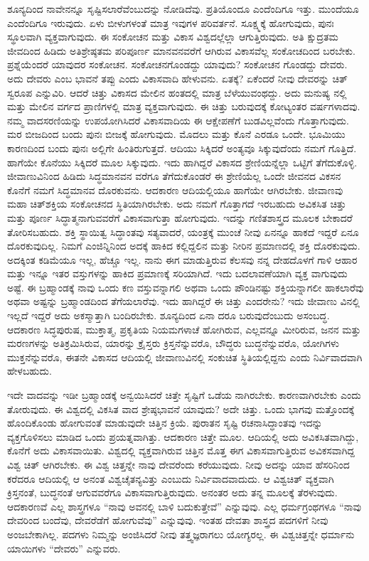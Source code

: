 ಶೂನ್ಯದಿಂದ ನಾವೇನನ್ನೂ ಸೃಷ್ಟಿಸಲಾರೆವೆಂಬುದನ್ನು ನೋಡಿದೆವು. ಪ್ರತಿಯೊಂದೂ ಎಂದೆಂದಿಗೂ ಇತ್ತು. ಮುಂದೆಯೂ ಎಂದೆಂದಿಗೂ ಇರುವುದು. ಏಳು ಬೀಳುಗಳಂತೆ ಮಾತ್ರ ಇವುಗಳ ಪರಿವರ್ತನೆ. ಸೂಕ್ಷ್ಮಕ್ಕೆ ಹೋಗುವುದು, ಪುನಃ ಸ್ಥೂಲವಾಗಿ ವ್ಯಕ್ತವಾಗುವುದು. ಈ ಸಂಕೋಚನ ಮತ್ತು ವಿಕಾಸ ವಿಶ್ವದಲ್ಲೆಲ್ಲಾ ಆಗುತ್ತಿರುವುದು. ಅತಿ ಕ್ಷುದ್ರತಮ ಜೀವದಿಂದ ಹಿಡಿದು ಅತಿಶ್ರೇಷ್ಠತಮ ಪರಿಪೂರ್ಣ ಮಾನವನವರೆಗೆ ಆಗಿರುವ ವಿಕಾಸವೆಲ್ಲ ಸಂಕೋಚದಿಂದ ಬರಬೇಕು. ಪ್ರಶ್ನೆಯೆಂದರೆ ಯಾವುದರ ಸಂಕೋಚನ. ಸಂಕೋಚನಗೊಂಡದ್ದು ಯಾವುದು? ಸಂಕೋಚನ ಗೊಂಡದ್ದು ದೇವರು. ಅದು ದೇವರು ಎಂಬ ಭಾವನೆ ತಪ್ಪು ಎಂದು ವಿಕಾಸವಾದಿ ಹೇಳುವನು. ಏತಕ್ಕೆ? ಏಕೆಂದರೆ ನೀವು ದೇವರನ್ನು ಚಿತ್​ಸ್ವರೂಪ ಎನ್ನುವಿರಿ. ಆದರೆ ಚಿತ್ತು ವಿಕಾಸದ ಮೇಲಿನ ಹಂತದಲ್ಲಿ ಮಾತ್ರ ಬೆಳೆಯುವಂಥದ್ದು. ಅದು ಮನುಷ್ಯ ನಲ್ಲಿ ಮತ್ತು ಮೇಲಿನ ವರ್ಗದ ಪ್ರಾಣಿಗಳಲ್ಲಿ ಮಾತ್ರ ವ್ಯಕ್ತವಾಗುವುದು. ಈ ಚಿತ್ತು ಬರುವುದಕ್ಕೆ ಕೋಟ್ಯಂತರ ವರ್ಷಗಳಾದವು. ನಮ್ಮ ವಾದಸರಣಿಯನ್ನು ಉಪಯೋಗಿಸಿದರೆ ವಿಕಾಸವಾದಿಯ ಈ ಆಕ್ಷೇಪಣೆಗೆ ಬುಡವಿಲ್ಲವೆಂದು ಗೊತ್ತಾಗುವುದು. ಮರ ಬೀಜದಿಂದ ಬಂದು ಪುನಃ ಬೀಜಕ್ಕೆ ಹೋಗುವುದು. ಮೊದಲು ಮತ್ತು ಕೊನೆ ಎರಡೂ ಒಂದೇ. ಭೂಮಿಯು ಕಾರಣದಿಂದ ಬಂದು ಪುನಃ ಅಲ್ಲಿಗೇ ಹಿಂತಿರುಗುತ್ತದೆ. ಆದಿಯು ಸಿಕ್ಕಿದರೆ ಅಂತ್ಯವೂ ಸಿಕ್ಕುವುದೆಂದು ನಮಗೆ ಗೊತ್ತಿದೆ. ಹಾಗೆಯೇ ಕೊನೆಯು ಸಿಕ್ಕಿದರೆ ಮೂಲ ಸಿಕ್ಕುವುದು. ಇದು ಹಾಗಿದ್ದರೆ ವಿಕಾಸದ ಶ್ರೇಣಿಯನ್ನೆಲ್ಲಾ ಒಟ್ಟಿಗೆ ತೆಗೆದುಕೊಳ್ಳಿ. ಜೀವಾಣುವಿನಿಂದ ಹಿಡಿದು ಸಿದ್ಧಮಾನವನ ವರೆಗೂ ತೆಗೆದುಕೊಂಡರೆ ಈ ಶ್ರೇಣಿಯೆಲ್ಲ ಒಂದೇ ಜೀವನದ ವಿಕಸನ ಕೊನೆಗೆ ನಮಗೆ ಸಿದ್ಧಮಾನವ ದೊರಕುವನು. ಆದಕಾರಣ ಆದಿಯಲ್ಲಿಯೂ ಹಾಗೆಯೇ ಆಗಿರಬೇಕು. ಜೀವಾಣವು ಮಹಾ ಚಿತ್​ಶಕ್ತಿಯ ಸಂಕೋಚನದ ಸ್ಥಿತಿಯಾಗಿರಬೇಕು. ಅದು ನಮಗೆ ಗೊತ್ತಾಗದೆ ಇರಬಹುದು ಅವಿಕಸಿತ ಚಿತ್ತು ಮತ್ತು ಪೂರ್ಣ ಸಿದ್ಧಾತ್ಮನಾಗುವವರೆಗೆ ವಿಕಾಸವಾಗುತ್ತಾ ಹೋಗುವುದು. ಇದನ್ನು ಗಣಿತಶಾಸ್ತ್ರದ ಮೂಲಕ ಬೇಕಾದರೆ ತೋರಿಸಬಹುದು. ಶಕ್ತಿ ಸ್ಥಾಯಿತ್ವ ಸಿದ್ಧಾಂತವು ಸತ್ಯವಾದರೆ, ಯಂತ್ರಕ್ಕೆ ಮುಂಚೆ ನೀವು ಏನನ್ನೂ ಹಾಕದೆ ಇದ್ದರೆ ಏನೂ ದೊರಕುವುದಿಲ್ಲ. ನಿಮಗೆ ಎಂಜಿನ್ನಿನಿಂದ ಅದಕ್ಕೆ ಹಾಕಿದ ಕಲ್ಲಿದ್ದಲಿನ ಮತ್ತು ನೀರಿನ ಪ್ರಮಾಣದಲ್ಲಿ ಶಕ್ತಿ ದೊರಕುವುದು. ಅದಕ್ಕಿಂತ ಕಡಿಮೆಯೂ ಇಲ್ಲ, ಹೆಚ್ಚೂ ಇಲ್ಲ. ನಾನು ಈಗ ಮಾಡುತ್ತಿರುವ ಕೆಲಸವು ನನ್ನ ದೇಹದೊಳಗೆ ಗಾಳಿ ಆಹಾರ ಮತ್ತು ಇನ್ನೂ ಇತರ ವಸ್ತುಗಳನ್ನು ಹಾಕಿದ ಪ್ರಮಾಣಕ್ಕೆ ಸರಿಯಾಗಿದೆ. ಇದು ಬದಲಾವಣೆಯಾಗಿ ವ್ಯಕ್ತ ವಾಗುವುದು ಅಷ್ಟೆ. ಈ ಬ್ರಹ್ಮಾಂಡಕ್ಕೆ ನಾವು ಒಂದು ಕಣ ವಸ್ತುವನ್ನಾಗಲಿ ಅಥವಾ ಒಂದು ಪೌಂಡಿನಷ್ಟು ಶಕ್ತಿಯನ್ನಾಗಲೀ ಹಾಕಲಾರೆವು ಅಥವಾ ಅಷ್ಟನ್ನು ಬ್ರಹ್ಮಾಂಡದಿಂದ ತೆಗೆಯಲಾರೆವು. ಇದು ಹಾಗಿದ್ದರೆ ಈ ಚಿತ್ತು ಎಂದರೇನು? ಇದು ಜೀವಾಣು ವಿನಲ್ಲಿ ಇಲ್ಲದೆ ಇದ್ದರೆ ಅದು ಅಕಸ್ಮಾತ್ತಾಗಿ ಬಂದಿರಬೇಕು. ಶೂನ್ಯದಿಂದ ಏನಾ ದರೂ ಬರುವುದೆಂಬುದು ಅಸಂಬದ್ಧ. ಆದಕಾರಣ ಸಿದ್ಧಪುರುಷ, ಮುಕ್ತಾತ್ಮ, ಪ್ರಕೃತಿಯ ನಿಯಮಗಳಾಚೆ ಹೋಗಿರುವ, ಎಲ್ಲವನ್ನೂ ಮೀರಿರುವ, ಜನನ ಮತ್ತು ಮರಣಗಳನ್ನು ಅತಿಕ್ರಮಿಸಿರುವ, ಯಾರನ್ನು ಕ್ರೈಸ್ತರು ಕ್ರಿಸ್ತನೆನ್ನುವರೊ, ಬೌದ್ಧರು ಬುದ್ಧನೆನ್ನುವರೊ, ಯೋಗಿಗಳು ಮುಕ್ತನೆನ್ನುವರೊ, ಈತನೇ ವಿಕಾಸದ ಆದಿಯಲ್ಲಿ ಜೀವಾಣುವಿನಲ್ಲಿ ಸಂಕುಚಿತ ಸ್ಥಿತಿಯಲ್ಲಿದ್ದನು ಎಂದು ನಿರ್ವಿವಾದವಾಗಿ ಹೇಳಬಹುದು.

ಇದೇ ವಾದವನ್ನು ಇಡೀ ಬ್ರಹ್ಮಾಂಡಕ್ಕೆ ಅನ್ವಯಿಸಿದರೆ ಚಿತ್ತೇ ಸೃಷ್ಟಿಗೆ ಒಡೆಯ ನಾಗಿರಬೇಕು. ಕಾರಣವಾಗಿರಬೇಕು ಎಂದು ತೋರುವುದು. ಈ ವಿಶ್ವದಲ್ಲಿ ವಿಕಸಿತ ವಾದ ಶ್ರೇಷ್ಠಭಾವನೆ ಯಾವುದು? ಅದೇ ಚಿತ್ತು. ಒಂದು ಭಾಗವು ಮತ್ತೊಂದಕ್ಕೆ ಹೊಂದಿಕೊಂಡು ಹೋಗುವಂತೆ ಮಾಡುವುದೇ ಚಿತ್ತಿನ ಕ್ರಿಯೆ. ಪುರಾತನ ಸೃಷ್ಟಿ ರಚನಾಸಿದ್ಧಾಂತವು ಇದನ್ನು ವ್ಯಕ್ತಗೊಳಿಸಲು ಮಾಡಿದ ಒಂದು ಪ್ರಯತ್ನವಾಗಿತ್ತು. ಆದಕಾರಣ ಚಿತ್ತೇ ಮೂಲ. ಆದಿಯಲ್ಲಿ ಅದು ಅವಿಕಸಿತವಾಗಿದ್ದು, ಕೊನೆಗೆ ಅದು ವಿಕಾಸವಾಯಿತು. ವಿಶ್ವದಲ್ಲಿ ವ್ಯಕ್ತವಾಗಿರುವ ಚಿತ್ತಿನ ಮೊತ್ತ ಈಗ ವಿಕಾಸವಾಗುತ್ತಿರುವ ಅವಿಕಸವಾಗಿದ್ದ ವಿಶ್ವ ಚಿತ್​ ಆಗಿರಬೇಕು. ಈ ವಿಶ್ವ ಚಿತ್ತನ್ನೇ ನಾವು ದೇವರೆಂದು ಕರೆಯುವುದು. ನೀವು ಅದನ್ನು ಯಾವ ಹೆಸರಿನಿಂದ ಕರೆದರೂ ಆದಿಯಲ್ಲಿ ಆ ಅನಂತ ವಿಶ್ವಚೈತನ್ಯವಿತ್ತು ಎಂಬುದು ನಿರ್ವಿವಾದವಾದುದು. ಆ ವಿಶ್ವಚಿತ್​ ವ್ಯಕ್ತವಾಗಿ ಕ್ರಿಸ್ತನಂತೆ, ಬುದ್ಧನಂತೆ ಆಗುವವರೆಗೂ ವಿಕಾಸವಾಗುತ್ತಿರುವುದು. ಅನಂತರ ಅದು ತನ್ನ ಮೂಲಕ್ಕೆ ತೆರಳುವುದು. ಆದಕಾರಣವೆ ಎಲ್ಲ ಶಾಸ್ತ್ರಗಳೂ “ನಾವು ಅವನಲ್ಲಿ ಬಾಳಿ ಬದುಕುತ್ತೇವೆ” ಎನ್ನುವುವು. ಎಲ್ಲ ಧರ್ಮಗ್ರಂಥಗಳೂ “ನಾವು ದೇವರಿಂದ ಬಂದೆವು, ದೇವರೆಡೆಗೆ ಹೋಗುವೆವು” ಎನ್ನುವುವು. ಇಂತಹ ದೇವತಾ ಶಾಸ್ತ್ರದ ಪದಗಳಿಗೆ ನೀವು ಅಂಜಬೇಕಾಗಿಲ್ಲ. ಪದಗಳು ನಿಮ್ಮನ್ನು ಅಂಜಿಸಿದರೆ ನೀವು ತತ್ತ್ವಜ್ಞರಾಗಲು ಯೋಗ್ಯರಲ್ಲ. ಈ ವಿಶ್ವಚಿತ್ತನ್ನೇ ಧರ್ಮಾನು ಯಾಯಿಗಳು “ದೇವರು” ಎನ್ನುವರು.

